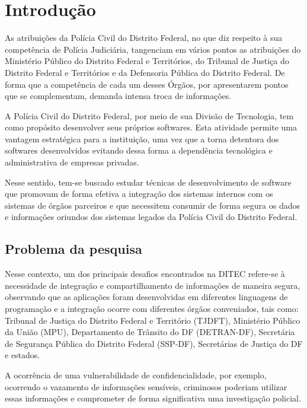 \chapter{Introdução}
As atribuições da Polícia Civil do Distrito Federal, no que diz respeito à sua competência de Polícia Judiciária, tangenciam em vários pontos as atribuições do Ministério Público do Distrito Federal e Territórios, do Tribunal de Justiça do Distrito Federal e Territórios e da Defensoria Pública do Distrito Federal. De forma que a competência de cada um desses Órgãos, por apresentarem pontos que se complementam, demanda intensa troca de informações.

A Polícia Civil do Distrito Federal, por meio de sua Divisão de Tecnologia, tem como propósito desenvolver seus próprios softwares. Esta atividade permite uma vantagem estratégica para a instituição, uma vez que a torna detentora dos softwares desenvolvidos evitando dessa forma a dependência tecnológica e administrativa de empresas privadas.

Nesse sentido, tem-se buscado estudar técnicas de desenvolvimento de software que promovam de forma efetiva a integração dos sistemas internos com os sistemas de órgãos parceiros e que necessitem consumir de forma segura os dados e informações oriundos dos sistemas legados da Polícia Civil do Distrito Federal.

\section{Problema da pesquisa}

Nesse contexto, um dos principais desafios encontrados na DITEC refere-se à necessidade de integração e compartilhamento de informações de maneira segura, observando que as aplicações foram desenvolvidas em diferentes linguagens de programação e a integração ocorre com diferentes órgãos conveniados, tais como: Tribunal de Justiça do Distrito Federal e Território (TJDFT), Ministério Público da União (MPU), Departamento de Trânsito do DF (DETRAN-DF), Secretária de Segurança Pública do Distrito Federal (SSP-DF), Secretárias de Justiça do DF e estados.

A ocorrência de uma vulnerabilidade de confidencialidade, por exemplo, ocorrendo o vazamento de informações sensíveis, criminosos poderiam utilizar essas informações e comprometer de forma significativa uma investigação policial.

